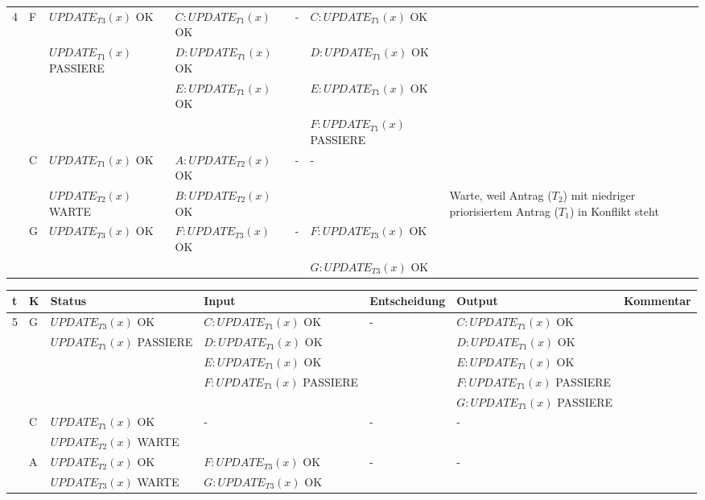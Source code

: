 \documentclass[a4paper]{article}
\begin{document}
\begin{landscape}
\begin{tabular}{| l | l | l | l | l | l | p{6cm} |}
4 & \multirow{4}{*}{F} 
			&	$UPDATE_{T3}(x)$ OK 					 & $C: UPDATE_{T1}(x)$ OK	& - &	 $C: UPDATE_{T1}(x)$ OK &\\
			& &$UPDATE_{T1}(x)$ PASSIERE & $D: UPDATE_{T1}(x)$ OK &   &		 $D: UPDATE_{T1}(x)$ OK &\\
			& &																	   	& $E: UPDATE_{T1}(x)$ OK& 	& 	 $E: UPDATE_{T1}(x)$ OK & \\
			& &																	   	& 															& 	& 	 $F: UPDATE_{T1}(x)$ PASSIERE & \\
\cline{2-7}
& \multirow{2}{*}{C} 
			&   $UPDATE_{T1}(x)$ OK 		& $A: UPDATE_{T2}(x)$ OK	& - &	 -  &\\
			&& $UPDATE_{T2}(x)$ WARTE   &  $B: UPDATE_{T2}(x)$ OK  &   &	  & Warte, weil Antrag ($T_2$) mit niedriger priorisiertem Antrag ($T_1$) in Konflikt steht\\
\cline{2-7}
& \multirow{2}{*}{G} 
			&   $UPDATE_{T3}(x)$ OK 		& $F: UPDATE_{T3}(x)$ OK	& - &	$F: UPDATE_{T3}(x)$ OK &\\
			&& 															   & 															   &    & $G: UPDATE_{T3}(x)$ OK  & \\
\hline
\end{tabular}
\newpage
\begin{tabular}{| l | l | l | l | l | l | p{5cm} |}
\hline
t & K & Status & Input & Entscheidung & Output & Kommentar \\
\hline
\hline


5 & \multirow{5}{*}{G} 
			&	$UPDATE_{T3}(x)$ OK 					 & $C: UPDATE_{T1}(x)$ OK	& - &	 $C: UPDATE_{T1}(x)$ OK &\\
			& &$UPDATE_{T1}(x)$ PASSIERE & $D: UPDATE_{T1}(x)$ OK &   &		 $D: UPDATE_{T1}(x)$ OK &\\
			& &																	   	& $E: UPDATE_{T1}(x)$ OK& 	& 	    $E: UPDATE_{T1}(x)$ OK & \\
			& &																	   	& $F: UPDATE_{T1}(x)$ PASSIERE& 	& 	 $F: UPDATE_{T1}(x)$ PASSIERE & \\
			& &																	   	&																					& 	& 	 $G: UPDATE_{T1}(x)$ PASSIERE & \\
\cline{2-7}
& \multirow{2}{*}{C} 
			&   $UPDATE_{T1}(x)$ OK 		& - 	& - &	 -  &\\
			&& $UPDATE_{T2}(x)$ WARTE   &   &   &	   &  \\
\cline{2-7}
& \multirow{2}{*}{A} 
			&    $UPDATE_{T2}(x)$ OK	      & $F: UPDATE_{T3}(x)$ OK	& - &	- &\\
			&&  $UPDATE_{T3}(x)$ WARTE  & 	$G: UPDATE_{T3}(x)$ OK  &    &   & \\
\hline
\hline



\end{tabular}
\end{landscape}
\end{document}
